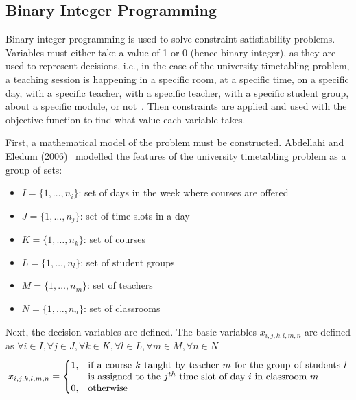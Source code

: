 \documentclass[a4paper, 12pt]{report}
\begin{document}
\subsection{Binary Integer Programming}

Binary integer programming is used to solve constraint satisfiability problems.
Variables must either take a value of 1 or 0 (hence binary integer), as they 
are used to represent decisions, i.e., in the case of the university 
timetabling problem, a teaching session is happening in a specific room, at a 
specific time, on a specific day, with a specific teacher, with a specific 
teacher, with a specific student group, about a specific module, or 
not~\cite{bip_example}.
Then constraints are applied and used with the objective function to find what
value each variable takes.

First, a mathematical model of the problem must be constructed.
Abdellahi and Eledum (2006)~\cite{bip_example} modelled the features of the
university timetabling problem as a group of sets:
\begin{itemize}
	\item
		\begin{math}
			I = \{ 1, \dots , n_i \}
		\end{math}: set of days in the week where courses are offered
	\item
		\begin{math}
			J = \{ 1, \dots , n_j \}
		\end{math}: set of time slots in a day
	\item 
		\begin{math}
			K = \{ 1, \dots , n_k \}
		\end{math}: set of courses
	\item 
		\begin{math}
			L = \{ 1, \dots , n_l \}
		\end{math}: set of student groups
	\item 
		\begin{math}
			M = \{ 1, \dots , n_m \}
		\end{math}: set of teachers
	\item 
		\begin{math}
			N = \{ 1, \dots , n_n \}
		\end{math}: set of classrooms
\end{itemize}

Next, the decision variables are defined. The basic variables
\begin{math}
	x_{i,j,k,l,m,n}
\end{math}
are defined as
\begin{math}
	\forall i \in I, \forall j \in J, \forall k \in K, \forall l \in L, \forall
	m \in M, \forall n \in N
\end{math}
\begin{align*}
	x_{i,j,k,l,m,n} = 
	\begin{cases}
		1, & \parbox[t]{9.5cm}{if a course \( k \) taught by teacher \( m \) for
		the group of students \( l \) is assigned to the \( j^{th} \) time slot 
		of day \( i \) in classroom \( m \)} \\
		0, & \text{otherwise}
	\end{cases}
\end{align*}
\end{document}
